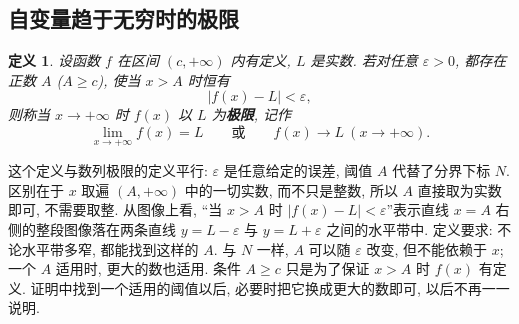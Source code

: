 \documentclass[UTF8,openany]{ctexbook}
\theoremstyle{chinesetextbook}
\newtheorem{definition}{定义}[section]
\begin{document}
\subsection{自变量趋于无穷时的极限}
\begin{definition}
设函数 $f$ 在区间 $(c,+\infty)$ 内有定义, $L$ 是实数. 若对任意 $\varepsilon>0$, 都存在正数 $A$ ($A\ge c$), 使当 $x>A$ 时恒有
\[
|f(x)-L|<\varepsilon,
\]
则称当 $x\to+\infty$ 时 $f(x)$ 以 $L$ 为\textbf{极限}, 记作
\[
\lim_{x\to+\infty}f(x)=L\qquad\text{或}\qquad f(x)\to L\ (x\to+\infty).
\]
\end{definition}
这个定义与数列极限的定义平行: $\varepsilon$ 是任意给定的误差, 阈值 $A$ 代替了分界下标 $N$. 区别在于 $x$ 取遍 $(A,+\infty)$ 中的一切实数, 而不只是整数, 所以 $A$ 直接取为实数即可, 不需要取整. 从图像上看, “当 $x>A$ 时 $|f(x)-L|<\varepsilon$”表示直线 $x=A$ 右侧的整段图像落在两条直线 $y=L-\varepsilon$ 与 $y=L+\varepsilon$ 之间的水平带中. 定义要求: 不论水平带多窄, 都能找到这样的 $A$. 与 $N$ 一样, $A$ 可以随 $\varepsilon$ 改变, 但不能依赖于 $x$; 一个 $A$ 适用时, 更大的数也适用. 条件 $A\ge c$ 只是为了保证 $x>A$ 时 $f(x)$ 有定义. 证明中找到一个适用的阈值以后, 必要时把它换成更大的数即可, 以后不再一一说明.
\end{document}
